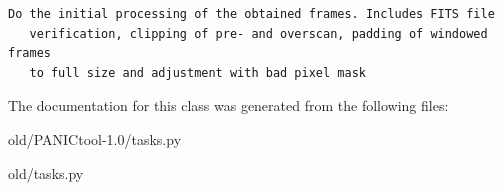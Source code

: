 \footnotesize\begin{verbatim}Do the initial processing of the obtained frames. Includes FITS file
   verification, clipping of pre- and overscan, padding of windowed frames
   to full size and adjustment with bad pixel mask
\end{verbatim}
\normalsize
 



The documentation for this class was generated from the following files:\begin{CompactItemize}
\item 
old/PANICtool-1.0/tasks.py\item 
old/tasks.py\end{CompactItemize}
